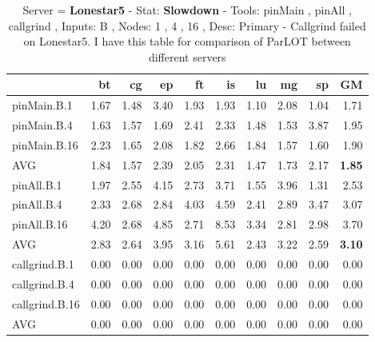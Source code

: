 \begin{table*}[]
\caption{Server = \textbf{Lonestar5} - Stat: \textbf{Slowdown} - 
 Tools: pinMain , pinAll , callgrind ,  
 Inputs: B ,  
 Nodes: 1 , 4 , 16 ,  
 Desc: Primary - Callgrind failed on Lonestar5. I have this table for comparison of ParLOT between different servers}
\label{ls5_sd_pMpAcg_B_itn_p3.5}\begin{center}
\begin{tabular}{|l|rrrrrrrr|r|}
\hline
                &   bt &   cg &   ep &   ft &   is &   lu &   mg &   sp &   GM \\
\hline
 pinMain.B.1    & 1.67 & 1.48 & 3.40 & 1.93 & 1.93 & 1.10 & 2.08 & 1.04 & 1.71 \\
 pinMain.B.4    & 1.63 & 1.57 & 1.69 & 2.41 & 2.33 & 1.48 & 1.53 & 3.87 & 1.95 \\
 pinMain.B.16   & 2.23 & 1.65 & 2.08 & 1.82 & 2.66 & 1.84 & 1.57 & 1.60 & 1.90 \\
 \hline
 AVG            & 1.84 & 1.57 & 2.39 & 2.05 & 2.31 & 1.47 & 1.73 & 2.17 & \textbf{1.85} \\
 \hline
 pinAll.B.1     & 1.97 & 2.55 & 4.15 & 2.73 & 3.71 & 1.55 & 3.96 & 1.31 & 2.53 \\
 pinAll.B.4     & 2.33 & 2.68 & 2.84 & 4.03 & 4.59 & 2.41 & 2.89 & 3.47 & 3.07 \\
 pinAll.B.16    & 4.20 & 2.68 & 4.85 & 2.71 & 8.53 & 3.34 & 2.81 & 2.98 & 3.70 \\
 \hline
 AVG            & 2.83 & 2.64 & 3.95 & 3.16 & 5.61 & 2.43 & 3.22 & 2.59 & \textbf{3.10} \\
 \hline
 callgrind.B.1  & 0.00 & 0.00 & 0.00 & 0.00 & 0.00 & 0.00 & 0.00 & 0.00 & 0.00 \\
 callgrind.B.4  & 0.00 & 0.00 & 0.00 & 0.00 & 0.00 & 0.00 & 0.00 & 0.00 & 0.00 \\
 callgrind.B.16 & 0.00 & 0.00 & 0.00 & 0.00 & 0.00 & 0.00 & 0.00 & 0.00 & 0.00 \\
 \hline
 AVG            & 0.00 & 0.00 & 0.00 & 0.00 & 0.00 & 0.00 & 0.00 & 0.00 & 0.00 \\
\hline
\end{tabular}
\end{center}
\end{table*}
